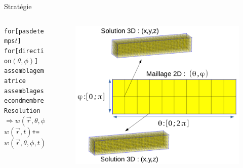 \begin{frame}{Stratégie}
\begin{columns}[c]
\begin{column}{6cm}
      \begin{alltt}
        for[ pas de temps $t$ ] \\        
        \hspace*{0.2cm} for[ direction $(\theta,\phi)$ ] \\
        \hspace*{0.4cm} assemblage matrice
        \hspace*{0.4cm} assemblage second membre
        \hspace*{0.4cm} Resolution $\Rightarrow w(\vec{r},\theta,\phi,t)$
        \hspace*{0.4cm} $w(\vec{r},t)$ += $w(\vec{r},\theta,\phi,t)$
      \end{alltt}
    \end{column}
    \begin{column}{6.5cm}
      \begin{figure}[H]
        \centering
        \includegraphics[scale=0.32]{Figures/Schema_mesh.png}
      \end{figure}
    \end{column}
  \end{columns}
\end{frame}


